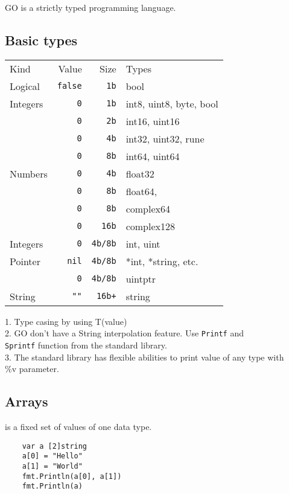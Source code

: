 \documentclass[12pt]{article}
\begin{document}
\begin{multicols}{2}
    GO is a strictly typed programming language.

    \subsection{Basic types}
    \label{subsec:basic-types}
    \begin{tabular}{lrrl}
    Kind        & Value         & Size             & Types       \\
    Logical     & \texttt{false}& \texttt{1b}      & bool \\
    Integers    & \texttt{0}    & \texttt{1b}      & int8, uint8, byte, bool \\
                & \texttt{0}    & \texttt{2b}      & int16, uint16 \\
                & \texttt{0}    & \texttt{4b}      & int32, uint32, rune\\
                & \texttt{0}    & \texttt{8b}      & int64, uint64\\
    Numbers     & \texttt{0}    & \texttt{4b}      & float32 \\
                & \texttt{0}    & \texttt{8b}      & float64,  \\
                & \texttt{0}    & \texttt{8b}      & complex64  \\
                & \texttt{0}    & \texttt{16b}     & complex128 \\
    Integers    & \texttt{0}    & \texttt{4b/8b}   & int, uint \\
    Pointer     & \texttt{nil}  & \texttt{4b/8b}   & *int, *string, etc. \\
                & \texttt{0}    & \texttt{4b/8b}   & uintptr \\
    String      & \texttt{""}   & \texttt{16b+}    & string \\
    \end{tabular}
    1. Type casing by using T(value) \\
    2. GO don't have a String interpolation feature. Use \texttt{Printf} and \\
    \texttt{Sprintf} function from the standard library. \\
    3. The standard library has flexible abilities to print value of any type with \\
    \%v parameter.

    \subsection{Arrays} is a fixed set of values of one data type.
    \begin{lstlisting}
    var a [2]string
    a[0] = "Hello"
    a[1] = "World"
    fmt.Println(a[0], a[1])
    fmt.Println(a)


\end{lstlisting}
\end{multicols}
\end{document}
